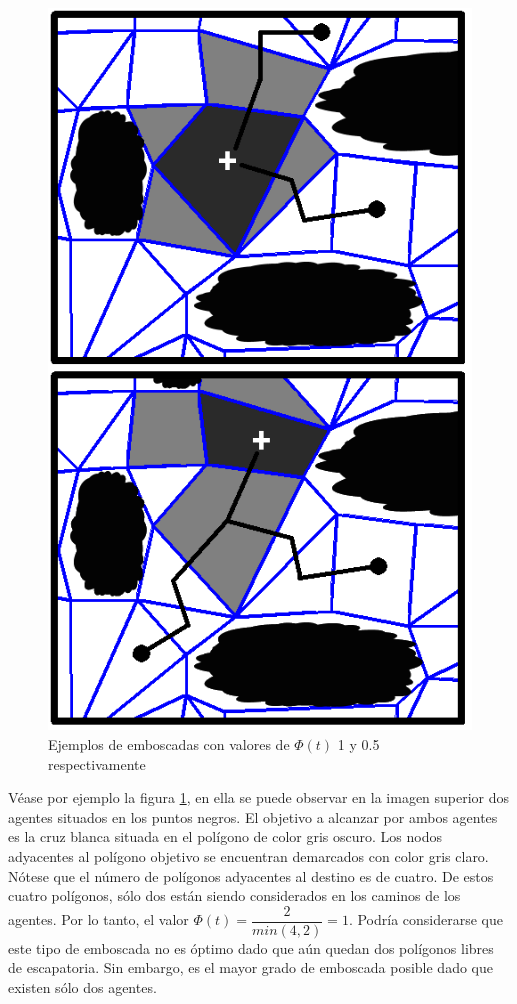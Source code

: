 \documentclass{egpubl}
\begin{document}
\begin{figure}[htb]
	\begin{center}
		\includegraphics[scale=0.4]{ambush_rate.png}
	\end{center}
	\caption{\label{fig:phi}
	     Ejemplos de emboscadas con valores de $\Phi(t)$ 
	     1 y 0.5 respectivamente}
\end{figure}

Véase por ejemplo la figura \ref{fig:phi}, en ella se puede
observar en la imagen superior dos agentes situados en los
puntos negros. El objetivo a alcanzar por ambos agentes es
la cruz blanca situada en el polígono de color gris oscuro.
Los nodos ad\-ya\-cen\-tes al polígono objetivo se encuentran
demarcados con color gris claro.
Nótese que el número de polígonos adyacentes al destino es de
cuatro. De estos cuatro polígonos, sólo dos están siendo
considerados en los caminos de los agentes. Por lo tanto, el
valor $\Phi(t) = \dfrac{2}{min(4,2)} = 1$. Podría con\-si\-de\-rar\-se
que este tipo de emboscada no es óptimo dado que aún
quedan dos polígonos libres de escapatoria. Sin embargo,
es el mayor grado de emboscada posible dado que existen
sólo dos agentes.
\end{document}
